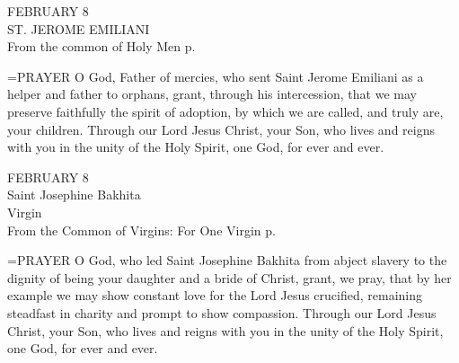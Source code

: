 \begin{center}\normalsize FEBRUARY 8\\
\footnotesize ST. JEROME EMILIANI\\
\footnotesize From the common of Holy Men p. \\
\end{center}

\hangindent=\parindent \small{PRAYER 
O God, Father of mercies,
who sent Saint Jerome Emiliani as a helper and father to orphans,
grant, through his intercession,
that we may preserve faithfully the spirit of adoption,
by which we are called, and truly are, your children.
Through our Lord Jesus Christ, your Son,
who lives and reigns with you in the unity of the Holy Spirit,
one God, for ever and ever.\\}
 
\begin{center}\normalsize FEBRUARY 8\\
\footnotesize Saint Josephine Bakhita  \\
\footnotesize Virgin\\
\footnotesize From the Common of Virgins: For One Virgin p.\\
\end{center}

\hangindent=\parindent \small{PRAYER 
O God, who led Saint Josephine Bakhita from abject slavery
to the dignity of being your daughter and a bride of Christ,
grant, we pray, that by her example
we may show constant love for the Lord Jesus crucified,
remaining steadfast in charity
and prompt to show compassion.
Through our Lord Jesus Christ, your Son,
who lives and reigns with you in the unity of the Holy Spirit,
one God, for ever and ever.\\}
 

